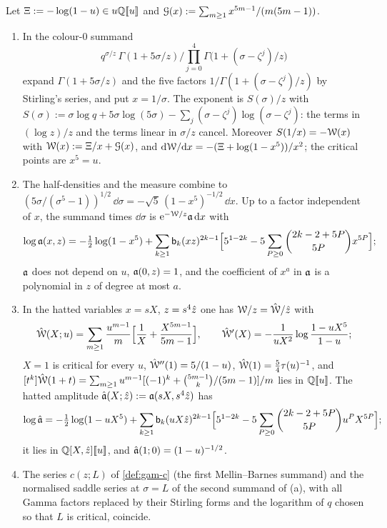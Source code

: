 \begin{lem}
\label{lem:con-form}
Let $\Xi:=-\log(1-u)\in u\mathbb{Q}[\![ u ]\!]$ and $\mathcal{G}(x):=\sum_{m\geq1}x^{5m-1}/(m(5m-1))$.
\begin{enumerate}
\item[(a)] In the colour-$0$ summand
\[
q^{\sigma/z}\,\Gamma(1+5\sigma/z)\Big/\prod_{j=0}^4\Gamma\bigl(1+(\sigma-\zeta^j)/z\bigr)
\]
expand $\Gamma(1+5\sigma/z)$ and the five factors $1/\Gamma(1+(\sigma-\zeta^j)/z)$ by Stirling's series, and put $x=1/\sigma$. The exponent is $S(\sigma)/z$ with $S(\sigma):=\sigma\log q+5\sigma\log(5\sigma)-\sum_j(\sigma-\zeta^j)\log(\sigma-\zeta^j)$: the terms in $(\log z)/z$ and the terms linear in $\sigma/z$ cancel. Moreover $S(1/x)=-\mathcal{W}(x)$ with $\mathcal{W}(x):=\Xi/x+\mathcal{G}(x)$, and $\mathrm{d}\mathcal{W}/\mathrm{d} x=-(\Xi+\log(1-x^5))/x^2$; the critical points are $x^5=u$.
\item[(b)] The half-densities and the measure combine to $(5\sigma/(\sigma^5-1))^{1/2}\,\dd\sigma=-\sqrt5\,(1-x^5)^{-1/2}\,\dd x$. Up to a factor independent of $x$, the summand times $\dd\sigma$ is $\mathrm{e}^{-\mathcal{W}/z}\mathfrak{a}\,\mathrm{d} x$ with
\[
\log\mathfrak{a}(x,z)=-\tfrac12\log(1-x^5)+\sum_{k\geq1}\mathsf{b}_k(xz)^{2k-1}\Bigl[5^{1-2k}-5\sum_{P\geq0}\binom{2k-2+5P}{5P}x^{5P}\Bigr];
\]
$\mathfrak{a}$ does not depend on $u$, $\mathfrak{a}(0,z)=1$, and the coefficient of $x^a$ in $\mathfrak{a}$ is a polynomial in $z$ of degree at most $a$.
\item[(c)] In the hatted variables $x=sX$, $z=s^4\hat{z}$ one has $\mathcal{W}/z=\hat{\mathcal{W}}/\hat{z}$ with
\[
\hat{\mathcal{W}}(X;u)=\sum_{m\geq1}\frac{u^{m-1}}m\Bigl[\frac1X+\frac{X^{5m-1}}{5m-1}\Bigr],\qquad \hat{\mathcal{W}}'(X)=-\frac1{uX^2}\log\frac{1-uX^5}{1-u};
\]
$X=1$ is critical for every $u$, $\hat{\mathcal{W}}''(1)=5/(1-u)$, $\hat{\mathcal{W}}(1)=\frac54\tau(u)^{-1}$, and $[t^k]\hat{\mathcal{W}}(1+t)=\sum_{m\geq1}u^{m-1}[(-1)^k+\binom{5m-1}{k}/(5m-1)]/m$ lies in $\mathbb{Q}[\![ u ]\!]$. The hatted amplitude $\hat{\mathfrak{a}}(X;\hat{z}):=\mathfrak{a}(sX,s^4\hat{z})$ has
\[
\log\hat{\mathfrak{a}}=-\tfrac12\log(1-uX^5)+\sum_{k\geq1}\mathsf{b}_k(uX\hat{z})^{2k-1}\Bigl[5^{1-2k}-5\sum_{P\geq0}\binom{2k-2+5P}{5P}u^PX^{5P}\Bigr];
\]
it lies in $\mathbb{Q}[X,\hat{z}][\![ u ]\!]$, and $\hat{\mathfrak{a}}(1;0)=(1-u)^{-1/2}$.
\item[(d)] The series $c(z;L)$ of \cref{def:gam-c} (the first Mellin--Barnes summand) and the normalised saddle series at $\sigma=L$ of the second summand of (a), with all Gamma factors replaced by their Stirling forms and the logarithm of $q$ chosen so that $L$ is critical, coincide.
\end{enumerate}
\end{lem}


